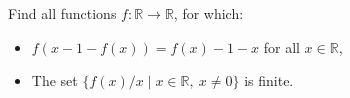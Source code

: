 Find all functions $f\colon\mathbb{R} \rightarrow \mathbb{R}$, for which:

\begin{itemize}
    \item $f(x-1-f(x))=f(x)-1-x$ for all $x \in \mathbb{R}$,
    \item The set $\{f(x)/x\mid  x \in \mathbb{R},\ x\neq 0\}$ is finite.
\end{itemize}
